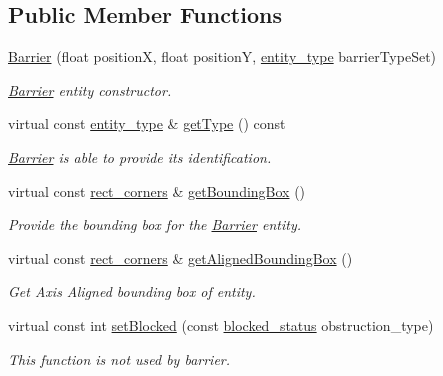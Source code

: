 \subsection*{Public Member Functions}
\begin{DoxyCompactItemize}
\item 
\hyperlink{classBarrier_aa5930a2e2b7cfc516a9badd3fcc8babd}{Barrier} (float position\-X, float position\-Y, \hyperlink{Structures_8h_a6d8f83e710b27d4f86c45f0bb77066e3}{entity\-\_\-type} barrier\-Type\-Set)
\begin{DoxyCompactList}\small\item\em \hyperlink{classBarrier}{Barrier} entity constructor. \end{DoxyCompactList}\item 
virtual const \hyperlink{Structures_8h_a6d8f83e710b27d4f86c45f0bb77066e3}{entity\-\_\-type} \& \hyperlink{classBarrier_a649b80eadc6948e68947f7516fee258c}{get\-Type} () const 
\begin{DoxyCompactList}\small\item\em \hyperlink{classBarrier}{Barrier} is able to provide its identification. \end{DoxyCompactList}\item 
virtual const \hyperlink{structrect__corners}{rect\-\_\-corners} \& \hyperlink{classBarrier_a050de6c9ffbb0a321c6d8a2e3d1dd418}{get\-Bounding\-Box} ()
\begin{DoxyCompactList}\small\item\em Provide the bounding box for the \hyperlink{classBarrier}{Barrier} entity. \end{DoxyCompactList}\item 
virtual const \hyperlink{structrect__corners}{rect\-\_\-corners} \& \hyperlink{classBarrier_a5fe813c8e78457566a5ff61235c12ea6}{get\-Aligned\-Bounding\-Box} ()
\begin{DoxyCompactList}\small\item\em Get Axis Aligned bounding box of entity. \end{DoxyCompactList}\item 
virtual const int \hyperlink{classBarrier_acff61ab4742c427abdf0d46abd52c832}{set\-Blocked} (const \hyperlink{Structures_8h_a6fef29d9424addfa69bdd2a379424896}{blocked\-\_\-status} obstruction\-\_\-type)
\begin{DoxyCompactList}\small\item\em This function is not used by barrier. \end{DoxyCompactList}\item 

\end{DoxyCompactItemize}

